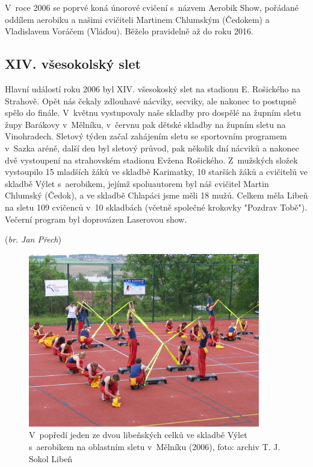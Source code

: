 \documentclass[a5paper, 11pt, twoside]{article}
\begin{document}
V~roce 2006 se poprvé koná únorové cvičení s~názvem Aerobik Show,
pořádané oddílem aerobiku a našimi cvičiteli Martinem Chlumským
(Čedokem) a Vladislavem Voráčem (Vláďou). Běželo pravidelně až do roku
2016.

\subsection{XIV. všesokolský slet}

Hlavní událostí roku 2006 byl XIV. všesokoský slet na stadionu E.
Rošického na Strahově. Opět nás čekaly zdlouhavé nácviky, secviky, ale
nakonec to postupně spělo do finále. V~květnu vystupovaly naše skladby
pro dospělé na župním sletu župy Barákovy v~Mělníku, v~červnu pak dětské
skladby na župním sletu na Vinohradech. Sletový týden začal zahájením
sletu se sportovním programem v~Sazka aréně, další den byl sletový
průvod, pak několik dní nácviků a nakonec dvě vystoupení na strahovském
stadionu Evžena Rošického. Z~mužských složek vystoupilo 15 mladších žáků
ve skladbě Karimatky, 10 starších žáků a cvičitelů ve skladbě Výlet
s~aerobikem, jejímž spoluautorem byl náš cvičitel Martin Chlumský (Čedok),
a ve skladbě Chlapáci jsme měli 18 mužů. Celkem měla Libeň na sletu 109
cvičenců v~10 skladbách (včetně společné krokovky "Pozdrav Tobě").
Večerní program byl doprovázen Laserovou show.

\hfill(\textit{br. Jan Přech})

\begin{figure}[h]
  \centering 
  \includegraphics[width=0.9\textwidth]{img/52_vylet_s_aerobikem.jpg}
  \caption*{V~popředí jeden ze dvou libeňských celků ve skladbě Výlet
  s~aerobikem na oblastním sletu v~Mělníku (2006), foto: archiv T. J. Sokol
  Libeň}
\end{figure}
\end{document}
